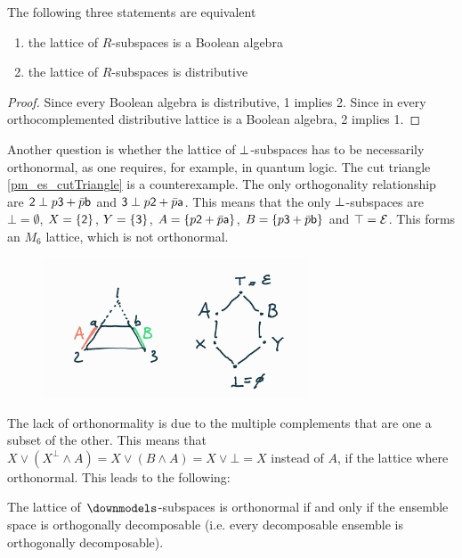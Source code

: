 \begin{conj}
	The following three statements are equivalent
	\begin{enumerate}
		\item the lattice of $R$-subspaces is a Boolean algebra
		\item the lattice of $R$-subspaces is distributive
	\end{enumerate}
\end{conj}

\begin{proof}
	Since every Boolean algebra is distributive, 1 implies 2. Since in every orthocomplemented distributive lattice is a Boolean algebra, 2 implies 1.
\end{proof}

Another question is whether the lattice of $\ortho$-subspaces has to be necessarily orthonormal, as one requires, for example, in quantum logic. The cut triangle \ref{pm_es_cutTriangle} is a counterexample. The only orthogonality relationship are $\ens[2] \ortho p \ens[3] + \bar{p}\ens[b]$ and $\ens[3] \ortho p \ens[2] + \bar{p}\ens[a]$. This means that the only $\ortho$-subspaces are $\bot = \emptyset$, $X= \{\ens[2]\}$, $Y= \{\ens[3]\}$, $A= \{p \ens[2] + \bar{p}\ens[a]\}$, $B= \{p \ens[3] + \bar{p}\ens[b]\}$ and $\top = \Ens$. This forms an $M_6$ lattice, which is not orthonormal.

\begin{figure}[h]
	\centering
	\includegraphics[width=0.7\textwidth]{tempimages/CutTriangleSubspaces.jpg}
\end{figure}

The lack of orthonormality is due to the multiple complements that are one a subset of the other. This means that $X \vee (X^\perp \wedge A) = X \vee (B \wedge A) = X \vee \bot = X$ instead of $A$, if the lattice where orthonormal. This leads to the following:

\begin{conj}
	The lattice of $\separate$-subspaces is orthonormal if and only if the ensemble space is orthogonally decomposable (i.e. every decomposable ensemble is orthogonally decomposable).
\end{conj}

